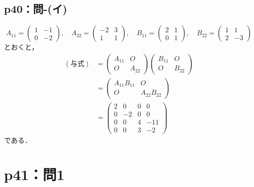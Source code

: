 \documentclass[a4paper,10pt,fleqn]{ltjsarticle}
\begin{document}
\subsection*{p40：問-(イ)}

\begin{tleftbar}
  \[
    A_{11} = \begin{pmatrix} 1 & -1 \\ 0 & -2 \end{pmatrix},\quad A_{22} = \begin{pmatrix} -2 & 3 \\ 1 & 1 \end{pmatrix} ,\quad B_{11} = \begin{pmatrix} 2 & 1 \\ 0 & 1\end{pmatrix} ,\quad B_{22}= \begin{pmatrix} 1 & 1 \\ 2 & -3 \end{pmatrix}
  \]
  とおくと，
  \begin{align*}
    (\text{与式}) & = \begin{pmatrix} A_{11} & O \\ O & A_{22} \end{pmatrix} \begin{pmatrix} B_{11} & O \\ O & B_{22} \end{pmatrix} \\
                & = \begin{pmatrix} A_{11} B_{11} & O \\ O & A_{22} B_{22} \end{pmatrix}                                          \\
                & = \begin{pmatrix} 2 & 0 & 0 & 0 \\ 0 & -2 & 0 & 0 \\ 0 & 0 & 4 & -11 \\ 0 & 0 & 3 & -2 \end{pmatrix}
  \end{align*}
  である．
\end{tleftbar}

\section*{p41：問1}
%
\end{document}
